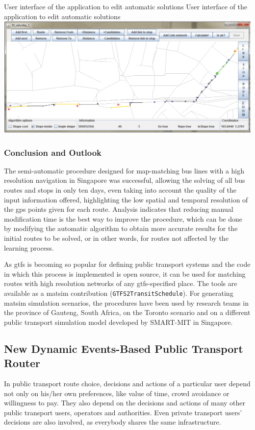 \createfigure
{User interface of the application to edit automatic solutions}
{User interface of the application to edit automatic solutions}
{\label{fig:Application}}
{\includegraphics[width=1.0\textwidth]{extending/figures/semiAuto/Application.png}}
{}

\subsubsection{Conclusion and Outlook}
The semi-automatic procedure designed for map-matching bus lines with a high resolution navigation in Singapore was successful, allowing the solving of all bus routes and stops in only ten days, even taking into account the quality of the input information offered, highlighting the low spatial and temporal resolution of the \gls{gps} points given for each route. Analysis indicates that reducing manual modification time is the best way to improve the procedure, which can be done by modifying the automatic algorithm to obtain more accurate results for the initial routes to be solved, or in other words, for routes not affected by the learning process.

As \gls{gtfs} is becoming so popular for defining public transport systems and the code in which this process is implemented is open source, it can be used for matching routes with high resolution networks of any \gls{gtfs}-specified place. The tools are available as a \gls{matsim} \gls{contribution} (\lstinline|GTFS2TransitSchedule|). For generating \gls{matsim} simulation scenarios, the procedures have been used by research teams in the province of Gauteng, South Africa, on the Toronto scenario and on a different public transport simulation model developed by SMART-MIT in Singapore.

\subsection{New Dynamic Events-Based Public Transport Router}
In public transport route choice, decisions and actions of a particular user depend not only on his/her own preferences, like value of time, crowd avoidance or willingness to pay. They also depend on the decisions and actions of many other public transport users, operators and authorities. Even private transport users' decisions are also involved, as everybody shares the same infrastructure.

